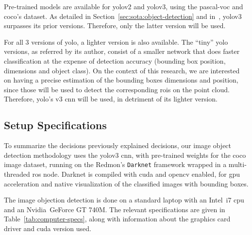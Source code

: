 Pre-trained models are available for \ac{yolo}v2 and \ac{yolo}v3, using the \ac{pascal-voc} and \ac{coco}'s dataset. As detailed in Section~\ref{sec:sota:object-detection} and in~\cite{Redmon2018}, \ac{yolo}v3 surpasses its prior versions. Therefore, only the latter version will be used. 

For all 3 versions of \ac{yolo}, a lighter version is also available. The ``tiny'' \ac{yolo} versions, as referred by its author, consist of a smaller network that does faster classification at the expense of detection accuracy (bounding box position, dimensions and object class). On the context of this research, we are interested on having a precise estimation of the bounding boxes dimensions and position, since those will be used to detect the corresponding \acp{roi} on the point cloud. Therefore, \ac{yolo}'s v3 \ac{cnn} will be used, in detriment of its lighter version.

\subsection{Setup Specifications}
To summarize the decisions previously explained decisions, our image object detection methodology uses the \ac{yolo}v3 \ac{cnn}, with pre-trained weights for the \ac{coco} image dataset, running on the Redmon's \texttt{Darknet} framework wrapped in a multi-threaded \ac{ros} node. Darknet is compiled with \ac{cuda} and \ac{opencv} enabled, for \ac{gpu} acceleration and native visualization of the classified images with bounding boxes.

The image objection detection is done on a standard laptop with an Intel\cp~i7 \ac{cpu} and an Nvidia\cp~GeForce GT 740M. The relevant specifications are given in Table~\ref{tab:computer-specs}, along with information about the graphics card driver and \ac{cuda} version used.

